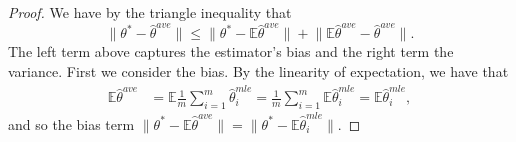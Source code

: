\documentclass[twoside]{article}
\newcommand{\E}{\mathbb{E}}
\newcommand{\w}{\theta}
\newcommand{\wave}{\hat\w^{ave}}
\newcommand{\wmle}{\hat\w^{mle}}
\newcommand{\wstar}{{\w^{*}}}
\newcommand{\ltwo}[1]{{\lVert {#1} \rVert}}
\begin{document}
\begin{proof}
We have by the triangle inequality that
\begin{equation}
\ltwo{\wstar-\wave} \le \ltwo{\wstar-\E\wave} + \ltwo{\E\wave-\wave}
.
\label{eq:biasvar}
\end{equation}
The left term above captures the estimator's bias and the right term the variance.
First we consider the bias.
By the linearity of expectation, we have that
\begin{align}
\E\wave
&=
\E\frac{1}{m}\sum_{i=1}^m\wmle_i
=
\frac{1}{m}\sum_{i=1}^m\E\wmle_i
=
\E\wmle_i
,
\label{eq:expwave}
\end{align}
and so the bias term
$\ltwo{\wstar-\E\wave}
=
\ltwo{\wstar-\E\wmle_i}
$.


\end{proof}
\end{document}
